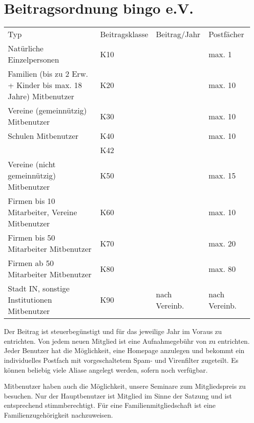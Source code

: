 \section{Beitragsordnung bingo e.V.} \label{sec:beitragsordnung}
\begin{tabu}{X[3]XX[r]X}
	\rowfont{\bfseries}
	Typ                                                             & Beitrags\-klasse& Beitrag/Jahr      & Postfächer \\
	Natürliche Einzelpersonen                                       & K10             &         & max. 1 \\
	Familien (bis zu 2 Erw. + Kinder bis max. 18 Jahre) Mitbenutzer & K20             &         & max. 10\\
	Vereine (gemeinnützig) Mitbenutzer                              & K30             &         & max. 10\\
	Schulen Mitbenutzer                                             & K40             &         & max. 10\\
									& K42             &        &        \\
	Vereine (nicht gemeinnützig) Mitbenutzer                        & K50             &        & max. 15\\
	Firmen bis 10 Mitarbeiter, Vereine Mitbenutzer                  & K60             &        & max. 10\\
	Firmen bis 50 Mitarbeiter Mitbenutzer                           & K70             &        & max. 20\\
	Firmen ab 50 Mitarbeiter Mitbenutzer                            & K80             &        & max. 80\\
	Stadt IN, sonstige Institutionen Mitbenutzer                    & K90             & nach Vereinb.     & nach Vereinb.\\
\end{tabu}

Der Beitrag ist steuerbegünstigt und für das jeweilige Jahr im Voraus zu entrichten.
Von jedem neuen Mitglied ist eine Aufnahmegebühr von  zu entrichten.
Jeder Benutzer hat die Möglichkeit, eine Homepage anzulegen
und bekommt ein individuelles Postfach mit vorgeschaltetem Spam- und Virenfilter zugeteilt.
Es können beliebig viele Aliase angelegt werden, sofern noch verfügbar.

Mitbenutzer haben auch die Möglichkeit, unsere Seminare zum Mitgliedspreis zu besuchen.
Nur der Hauptbenutzer ist Mitglied im Sinne der Satzung und ist entsprechend stimmberechtigt.
Für eine Familienmitgliedschaft ist eine Familienzugehörigkeit nachzuweisen.


